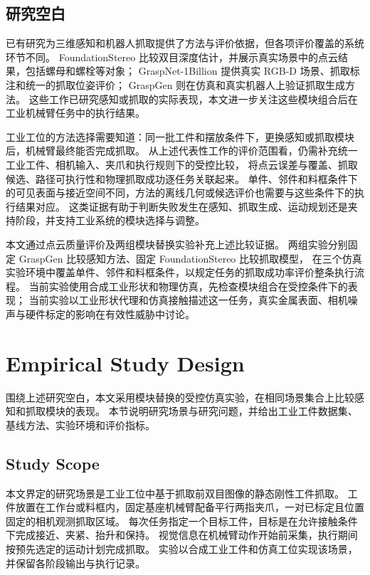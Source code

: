 \documentclass[UTF8,fontset=fandol,a4paper,11pt]{ctexart}
\newcommand{\qyb}[1]{#1}
\begin{document}
\subsection{\qyb{研究空白}}
\label{sec:research-gap}

已有研究为三维感知和机器人抓取提供了方法与评价依据，但各项评价覆盖的系统环节不同。
FoundationStereo 比较双目深度估计，并展示真实场景中的点云结果，包括螺母和螺栓等对象\cite{wen2025}；
GraspNet-1Billion 提供真实 RGB-D 场景、抓取标注和统一的抓取位姿评价\cite{fang2020}；
GraspGen 则在仿真和真实机器人上验证抓取生成方法\cite{murali2026}。
这些工作已研究感知或抓取的实际表现，本文进一步关注这些模块组合后在工业机械臂任务中的执行结果。

工业工位的方法选择需要知道：同一批工件和摆放条件下，更换感知或抓取模块后，机械臂最终能否完成抓取。
从上述代表性工作的评价范围看，仍需补充统一工业工件、相机输入、夹爪和执行规则下的受控比较，
将点云误差与覆盖、抓取候选、路径可执行性和物理抓取成功逐任务关联起来。
单件、邻件和料框条件下的可见表面与接近空间不同，方法的离线几何或候选评价也需要与这些条件下的执行结果对应。
这类证据有助于判断失败发生在感知、抓取生成、运动规划还是夹持阶段，并支持工业系统的模块选择与调整。

本文通过点云质量评价及两组模块替换实验补充上述比较证据。
两组实验分别固定 GraspGen 比较感知方法、固定 FoundationStereo 比较抓取模型，
在三个仿真实验环境中覆盖单件、邻件和料框条件，以规定任务的抓取成功率评价整条执行流程。
当前实验使用合成工业形状和物理仿真，先检查模块组合在受控条件下的表现；
当前实验以工业形状代理和仿真接触描述这一任务，真实金属表面、相机噪声与硬件标定的影响在有效性威胁中讨论。

\section{\qyb{Empirical Study Design}}
\label{sec:design}

围绕上述研究空白，本文采用模块替换的受控仿真实验，在相同场景集合上比较感知和抓取模块的表现。
本节说明研究场景与研究问题，并给出工业工件数据集、基线方法、实验环境和评价指标。

\subsection{\qyb{Study Scope}}

本文界定的研究场景是工业工位中基于抓取前双目图像的静态刚性工件抓取。
工件放置在工作台或料框内，固定基座机械臂配备平行两指夹爪，一对已标定且位置固定的相机观测抓取区域。
每次任务指定一个目标工件，目标是在允许接触条件下完成接近、夹紧、抬升和保持。
视觉信息在机械臂动作开始前采集，执行期间按预先选定的运动计划完成抓取。
实验以合成工业工件和仿真工位实现该场景，并保留各阶段输出与执行记录。
\end{document}
